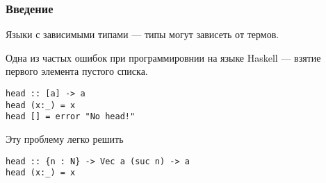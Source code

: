 
\begin{frame}[fragile]
\frametitle{Введение}
Языки с зависимыми типами --- типы могут зависеть от термов.

Одна из частых ошибок при программировнии на языке Haskell --- взятие первого элемента пустого списка.

\begin{verbatim}
head :: [a] -> a
head (x:_) = x
head [] = error "No head!"
\end{verbatim}

Эту проблему легко решить

\begin{verbatim}
head :: {n : N} -> Vec a (suc n) -> a
head (x:_) = x
\end{verbatim}


\end{frame}


